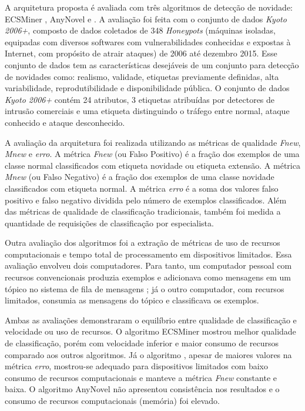 A arquitetura proposta é avaliada com três algoritmos de detecção de novidade:
ECSMiner \cite{Masud2010ECSMiner}, AnyNovel \cite{Abdallah2016anynovel} e \minas
\cite{Faria2016minas}.
A avaliação foi feita com o conjunto de dados \emph{Kyoto 2006+}, composto de
dados coletados de 348 \emph{Honeypots} 
(máquinas isoladas, equipadas com diversos
softwares com vulnerabilidades conhecidas e expostas à Internet, com propósito de
atrair ataques) de 2006 até dezembro 2015.
Esse conjunto de dados tem as características desejáveis de um conjunto para detecção de
novidades como: realismo, validade, etiquetas previamente definidas, alta
variabilidade, reprodutibilidade e disponibilidade pública.
O conjunto de dados \emph{Kyoto 2006+} contém 24 atributos, 3 etiquetas atribuídas por
detectores de intrusão comerciais e uma etiqueta
distinguindo o tráfego entre normal, ataque conhecido e ataque desconhecido.

A avaliação da arquitetura foi realizada utilizando as métricas de qualidade
\emph{Fnew}, \emph{Mnew} e \emph{erro}.
A métrica \emph{Fnew} (ou Falso Positivo) é a fração dos exemplos de uma classe normal
classificados com etiqueta novidade ou etiqueta extensão.
A métrica \emph{Mnew} (ou Falso Negativo) é a fração dos exemplos de uma classe novidade
classificados com etiqueta normal.
A métrica \emph{erro} é a soma dos valores falso positivo e falso negativo dividida
pelo número de exemplos classificados.
Além das métricas de qualidade de classificação tradicionais, também foi medida
a quantidade de requisições de classificação por especialista.

Outra avaliação dos algoritmos foi a extração de métricas de uso de recursos
computacionais e tempo total de processamento em dispositivos limitados.
Essa avaliação envolveu dois computadores.
Para tanto, um computador pessoal com recursos
convencionais produzia exemplos e adicionava como mensagens em um tópico no
sistema de fila de mensagens \kafka; já o outro computador, com recursos
limitados, consumia as mensagens do tópico e classificava os exemplos.

Ambas as avaliações demonstraram o equilíbrio entre qualidade de classificação e
velocidade ou uso de recursos.
O algoritmo ECSMiner mostrou melhor qualidade de classificação, porém com
velocidade inferior e maior consumo de recursos comparado aos outros algoritmos.
Já o algoritmo \minas, apesar de maiores valores na métrica \emph{erro}, mostrou-se
adequado para dispositivos limitados com baixo consumo de recursos
computacionais e manteve a métrica \emph{Fnew} constante e baixa.
O algoritmo AnyNovel não apresentou consistência nos resultados e o consumo
de recursos computacionais (memória) foi elevado.

